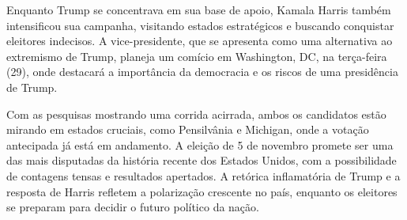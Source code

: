 \documentclass{minimal} %
\begin{document}
{Enquanto Trump se concentrava em sua base de apoio, Kamala Harris também intensificou sua campanha, visitando estados estratégicos e buscando conquistar eleitores indecisos. A vice-presidente, que se apresenta como uma alternativa ao extremismo de Trump, planeja um comício em Washington, DC, na terça-feira (29), onde destacará a importância da democracia e os riscos de uma presidência de Trump.

Com as pesquisas mostrando uma corrida acirrada, ambos os candidatos estão mirando em estados cruciais, como Pensilvânia e Michigan, onde a votação antecipada já está em andamento. A eleição de 5 de novembro promete ser uma das mais disputadas da história recente dos Estados Unidos, com a possibilidade de contagens tensas e resultados apertados. A retórica inflamatória de Trump e a resposta de Harris refletem a polarização crescente no país, enquanto os eleitores se preparam para decidir o futuro político da nação.}
\end{document}

